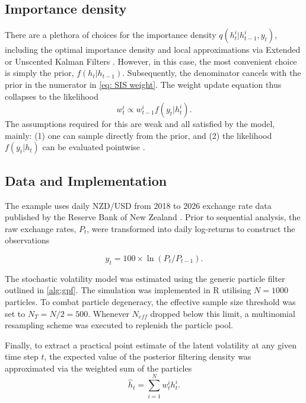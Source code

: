 \documentclass[10pt, a4paper]{article}
\numberwithin{equation}{section}
\begin{document}
\subsection{Importance density}
There are a plethora of choices for the importance density \(q(h_t^{i} | h_{t-1}^{i}, y_t)\), including the optimal importance density and local approximations via Extended or Unscented Kalman Filters \parencite{Elfring2021}. However, in this case, the most convenient choice is simply the prior, \(f(h_t | h_{t-1})\). Subsequently, the denominator cancels with the prior in the numerator in \autoref{eq: SIS weight}. The weight update equation thus collapses to the likelihood
\begin{equation}
    w_t^{i} \propto w_{t-1}^{i} f(y_t | h_t^{i}).
\end{equation}
The assumptions required for this are weak and all satisfied by the model, mainly: (1) one can sample directly from the prior, and (2) the likelihood \(f(y_t | h_t)\) can be evaluated pointwise \parencite{Arulampalam2002}.

\subsection{Data and Implementation}
The example uses daily NZD/USD from 2018 to 2026 exchange rate data published by the Reserve Bank of New Zealand \parencite{rbnz2026}. Prior to sequential analysis, the raw exchange rates, \(P_t\), were transformed into daily log-returns to construct the observations

\begin{equation}
    y_t = 100 \times \ln(P_t / P_{t-1}).
\end{equation}


The stochastic volatility model was estimated using the generic particle filter outlined in \autoref{alg:gpf}. The simulation was implemented in R utilising \(N = 1000\) particles. To combat particle degeneracy, the effective sample size threshold was set to \(N_T = N/2 = 500\). Whenever \(N_{eff}\) dropped below this limit, a multinomial resampling scheme was executed to replenish the particle pool.

Finally, to extract a practical point estimate of the latent volatility at any given time step \(t\), the expected value of the posterior filtering density was approximated via the weighted sum of the particles
\begin{equation}
    \hat{h}_t = \sum_{i=1}^N w_t^{i} h_t^{i}.
\end{equation}
\end{document}
